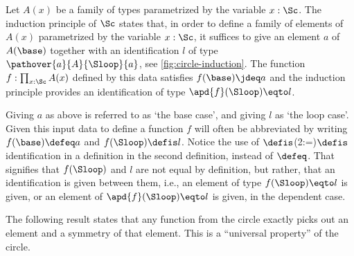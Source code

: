 \begin{definition}
Let $A(x)$ be a family of types parametrized by the variable $x:\Sc$.
The induction principle of $\Sc$ states that, in order to define a family
of elements of $A(x)$ parametrized by the variable $x:\Sc$,
it suffices to give an element $a$ of $A(\base)$ together with an
identification $l$ of type $\pathover{a}{A}{\Sloop}{a}$,
see \cref{fig:circle-induction}.
The function $f : \prod_{x:\Sc}A(x)$ defined by this
data satisfies $f(\base)\jdeq a$ and the induction principle
provides an identification of type $\apd{f}(\Sloop) \eqto l$.
\end{definition}

Giving $a$ as above is referred to as `the base case', and
giving $l$ as `the loop case'. Given this input data to define
a function $f$ will often be abbreviated by writing
$f(\base)\defeq a$ and $f(\Sloop)\defis l$.  Notice the use of $\defis$\glossary(2:=){$\defis$}{identification in a definition} in the
second definition, instead of $\defeq$.  That signifies that $f(\Sloop)$ and
$l$ are not equal by definition, but rather, that an identification is given between
them, i.e., an element of type $f(\Sloop) \eqto l$ is given, or an element of
$\apd{f}(\Sloop) \eqto l$ is given, in the dependent case.

The following result states that any function from the circle exactly
picks out an element and a symmetry of that element.
This is a ``universal property'' of the circle.

